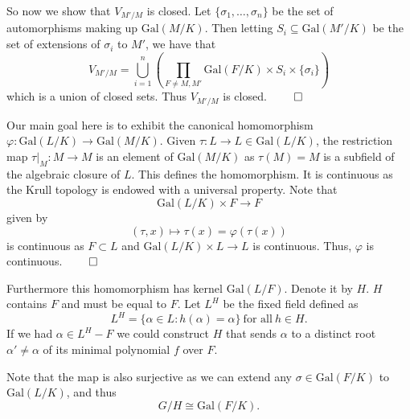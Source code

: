 \documentclass[a4paper, 12pt,oneside,openany]{book}
\begin{document}
So now we show that $V_{M'/M}$ is closed. Let $\{\sigma_1, \dots, \sigma_n\}$ be the set of automorphisms making up $\text{Gal}(M/K)$. Then letting $S_i \subseteq \text{Gal}(M'/K)$ be the set of extensions of $\sigma_i$ to $M'$, we have that $$V_{M'/M} = \bigcup\limits_{i=1}^n \left( \prod\limits_{F \neq M, M'} \text{Gal}(F/K) \times S_i \times \{\sigma_i \}\right)$$ which is a union of closed sets. Thus $V_{M'/M}$ is closed. $\qed$


 Our main goal here is to exhibit the canonical homomorphism $\varphi: \text{Gal}(L/K) \to \text{Gal}(M/K)$. Given $\tau: L\to L \in \text{Gal}(L/K)$, the restriction map $\tau |_M: M \to M$ is an element of $\text{Gal}(M/K)$ as $\tau(M)=M$ is a subfield of the algebraic closure of $L$. This defines the homomorphism. It is continuous as the Krull topology is endowed with a universal property. Note that $$\text{Gal}(L/K) \times F \to F$$ given by $$(\tau, x) \mapsto \tau(x) = \varphi(\tau(x))$$ is continuous as $F \subset L$ and $\text{Gal}(L/K) \times L \to L$ is continuous. Thus, $\varphi$ is continuous. $\qed$

Furthermore this homomorphism has kernel $\text{Gal}(L/F)$. Denote it by $H$. $H$ contains $F$ and must be equal to $F$. Let $L^H$ be the fixed field defined as $$L^H = \{\alpha \in L: h(\alpha)= \alpha\}\ \text{for all}\ h \in H.$$ If we had $\alpha \in L^H-F$ we could construct $H$ that sends $\alpha$ to a distinct root $\alpha' \neq \alpha$ of its minimal polynomial $f$ over $F$.  

Note that the map is also surjective as we can extend any $\sigma \in \text{Gal}(F/K)$ to $\text{Gal}(L/K)$, and thus $$G/H \cong \text{Gal}(F/K).$$

\end{document}
